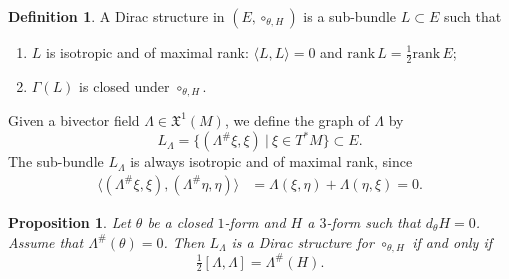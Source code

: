\documentclass[11pt,a4paper]{article}
\theoremstyle{plain}
\newtheorem{proposition}[theorem]{Proposition}
\theoremstyle{definition}
\newtheorem{definition}[theorem]{Definition}
\theoremstyle{remark}
\begin{document}
\begin{definition}
	A Dirac structure in $(E,\circ_{\theta,H})$ is a sub-bundle $L\subset E$ such that
	\begin{enumerate}
		\item[(i)]
		$L$ is isotropic and of maximal rank: $\langle L,L\rangle=0$ and $\mathrm{rank}\,L=\tfrac{1}{2}\mathrm{rank}\,E$;
		\item[(ii)]
		$\Gamma(L)$ is closed under $\circ_{\theta,H}$.
	\end{enumerate}
\end{definition}

Given a bivector field $\Lambda\in\mathfrak{X}^1(M)$, we define the graph of $\Lambda$ by
$$
L_\Lambda
=
\bigl\{(\Lambda^\#\xi,\xi)\ \big|\ \xi\in T^*M\bigr\}
\subset E.
$$
The sub-bundle $L_\Lambda$ is always isotropic and of maximal rank, since
\begin{align*}
	\langle (\Lambda^\#\xi,\xi),(\Lambda^\#\eta,\eta) \rangle
	&=
	\Lambda(\xi,\eta)+\Lambda(\eta,\xi)
	=
	0.
\end{align*}

\begin{proposition}\label{dirac}
	Let $\theta$ be a closed $1$-form and $H$ a $3$-form such that $d_{\theta}H=0$.
	Assume that $\Lambda^\#(\theta)=0$.
	Then $L_\Lambda$ is a Dirac structure for $\circ_{\theta,H}$ if and only if
	\begin{equation}\label{twistedPoisson}
		\tfrac{1}{2}[\Lambda,\Lambda] = \Lambda^\#(H).
	\end{equation}
\end{proposition}
\end{document}
